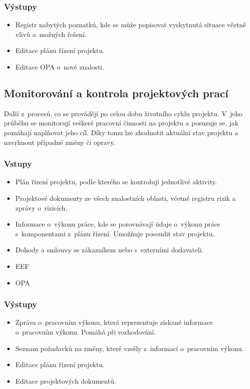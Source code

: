 \subsubsection*{Výstupy}
\begin{itemize}
    \item Registr nabytých poznatků, kde se může popisovat vyskytnutá situace včetně vlivů a~možných řešení.
    \item Editace plánu řízení projektu.
    \item Editace OPA o~nové znalosti.
\end{itemize}

\subsection*{Monitorování a kontrola projektových prací}

Další z~procesů, co se provádějí po celou dobu životního cyklu projektu. V~jeho průběhu se monitorují veškeré pracovní činnosti na projektu a posuzuje se, jak pomáhají naplňovat jeho cíl. Díky tomu lze zhodnotit aktuální stav projektu a navrhnout případné změny či opravy.

\subsubsection*{Vstupy}
\begin{itemize}
    \item Plán řízení projektu, podle kterého se kontrolují jednotlivé aktivity.
    \item Projektové dokumenty ze všech znalostních oblasti, včetně registru rizik a zprávy o~rizicích.
    \item Informace o~výkonu práce, kde se porovnávají údaje o~výkonu práce s~komponentami z~plánu řízení. Umožňuje posoudit stav projektu.
    \item Dohody a smlouvy se zákazníkem nebo s~externími dodavateli.
    \item EEF
    \item OPA
\end{itemize}
\subsubsection*{Výstupy}
\begin{itemize}
    \item Zpráva o~pracovním výkonu, která reprezentuje získané informace o~pracovním výkonu. Pomáhá při rozhodování.
    \item Seznam požadavků na změny, které vzešly z~informací o~pracovním výkonu.
    \item Editace plánu řízení projektu.
    \item Editace projektových dokumentů.
\end{itemize}

